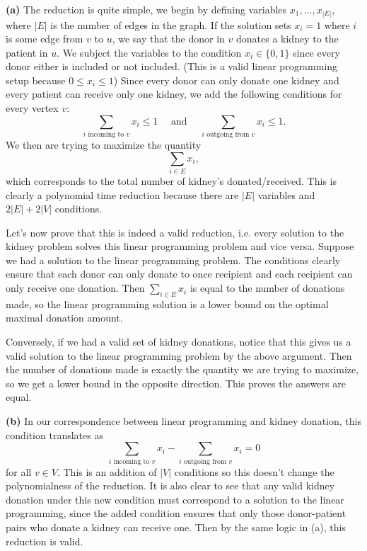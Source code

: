 \documentclass[11pt,letterpaper]{article}
\begin{document}
\begin{solution}
    \textbf{(a)} The reduction is quite simple, we begin by defining variables $x_1,\ldots,x_{|E|}$, where $|E|$ is the number of edges in the graph. If the solution sets $x_i=1$ where $i$ is some edge from $v$ to $u$, we say that the donor in $v$ donates a kidney to the patient in $u$. We subject the variables to the condition $x_i\in \{0,1\}$ since every donor either is included or not included. (This is a valid linear programming setup because $0\leq x_i\leq 1$) Since every donor can only donate one kidney and every patient can receive only one kidney, we add the following conditions for every vertex $v$:
    \[
        \sum_{i\textrm{ incoming to } v} x_i \leq 1\quad\textrm{ and }\quad \sum_{i\textrm{ outgoing from }v} x_i\leq 1.
    \] 
    We then are trying to maximize the quantity
    \[
        \sum_{i\in E}x_i,
    \] 
    which corresponds to the total number of kidney's donated/received. This is clearly a polynomial time reduction because there are $|E|$ variables and $2|E|+2|V|$ conditions. 

    Let's now prove that this is indeed a valid reduction, i.e. every solution to the kidney problem solves this linear programming problem and vice versa. Suppose we had a solution to the linear programming problem. The conditions clearly ensure that each donor can only donate to once recipient and each recipient can only receive one donation. Then $\sum_{i\in E}x_i$ is equal to the number of donations made, so the linear programming solution is a lower bound on the optimal maximal donation amount.

    Conversely, if we had a valid set of kidney donations, notice that this gives us a valid solution to the linear programming problem by the above argument. Then the number of donations made is exactly the quantity we are trying to maximize, so we get a lower bound in the opposite direction. This proves the answers are equal.

    \textbf{(b)} In our correspondence between linear programming and kidney donation, this condition translates as
    \[
        \sum_{i\textrm{ incoming to }v} x_i - \sum_{i\textrm{ outgoing from } v} x_i = 0
    \] 
    for all $v\in V$. This is an addition of $|V|$ conditions so this doesn't change the polynomialness of the reduction. It is also clear to see that any valid kidney donation under this new condition must correspond to a solution to the linear programming, since the added condition ensures that only those donor-patient pairs who donate a kidney can receive one. Then by the same logic in (a), this reduction is valid.


\end{solution}
\end{document}
